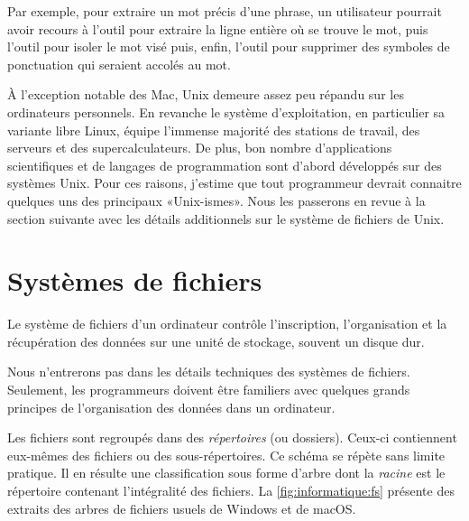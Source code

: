 Par exemple, pour extraire un mot précis d'une phrase, un utilisateur
pourrait avoir recours à l'outil  pour extraire la ligne
entière où se trouve le mot, puis l'outil  pour isoler le
mot visé puis, enfin, l'outil  pour supprimer des symboles
de ponctuation qui seraient accolés au mot.

À l'exception notable des Mac, Unix demeure assez peu
répandu sur les ordinateurs personnels. En revanche le système
d'exploitation, en particulier sa variante libre Linux, équipe
l'immense majorité des stations de travail, des serveurs et des
supercalculateurs. De plus, bon nombre d'applications scientifiques et
de langages de programmation sont d'abord développés sur des systèmes
Unix. Pour ces raisons, j'estime que tout programmeur devrait
connaitre quelques uns des principaux «Unix-ismes». Nous les passerons
en revue à la section suivante avec les détails additionnels sur le
système de fichiers de Unix.



\section{Systèmes de fichiers}
\label{sec:informatique:fs}

Le système de fichiers d'un ordinateur
contrôle l'inscription, l'organisation et la récupération des données
sur une unité de stockage, souvent un disque dur.

Nous n'entrerons pas dans les détails techniques des systèmes de
fichiers. Seulement, les programmeurs doivent être familiers avec
quelques grands principes de l'organisation des données dans un
ordinateur.

Les fichiers sont regroupés dans des
\emph{répertoires} (ou dossiers). Ceux-ci
contiennent eux-mêmes des fichiers ou des sous-répertoires. Ce schéma
se répète sans limite pratique. Il en résulte une classification sous
forme d'arbre dont la \emph{racine} est le répertoire contenant
l'intégralité des fichiers. La \autoref{fig:informatique:fs} présente
des extraits des arbres de fichiers usuels de Windows et de macOS.

